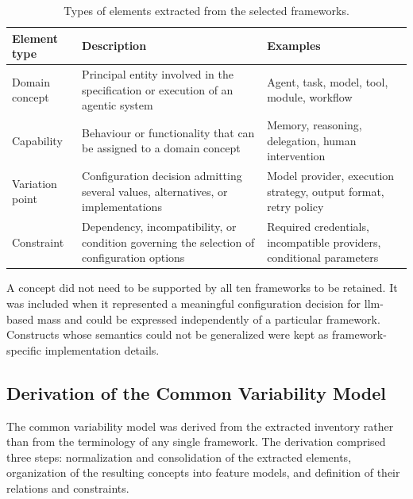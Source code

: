 \begin{table}[t]
    \centering
    \caption{Types of elements extracted from the selected frameworks.}
    \label{tab:extracted-element-types}
    \footnotesize
    \begin{tabularx}{\textwidth}{
        @{}
        p{}
        >{\raggedright\arraybackslash}X
        p{}
        @{}
    }
        \toprule
        \textbf{Element type}
        & \textbf{Description}
        & \textbf{Examples} \\
        \midrule

        Domain concept
        & Principal entity involved in the specification or execution of an
        agentic system
        & Agent, task, model, tool, module, workflow \\

        Capability
        & Behaviour or functionality that can be assigned to a domain concept
        & Memory, reasoning, delegation, human intervention \\

        Variation point
        & Configuration decision admitting several values, alternatives, or
        implementations
        & Model provider, execution strategy, output format, retry policy \\

        Constraint
        & Dependency, incompatibility, or condition governing the selection of
        configuration options
        & Required credentials, incompatible providers, conditional parameters \\

        \bottomrule
    \end{tabularx}
\end{table}

A concept did not need to be supported by all ten frameworks to be retained.
It was included when it represented a meaningful configuration decision for
\gls{llm}-based \gls{mas}s and could be expressed independently of a particular
framework. Constructs whose semantics could not be generalized were kept as
framework-specific implementation details.

\subsection{Derivation of the Common Variability Model}
\label{subsec:common-variability-model}

The common variability model was derived from the extracted inventory rather
than from the terminology of any single framework. The derivation comprised
three steps: normalization and consolidation of the extracted elements,
organization of the resulting concepts into feature models, and definition of
their relations and constraints.

